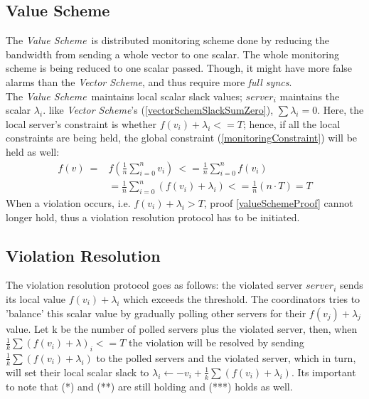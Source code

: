 \documentclass[10pt,a4paper]{article}
\newcommand{\vecScheme}{\textit{Vector Scheme}}
\newcommand{\valueScheme}{\textit{Value Scheme}}
\begin{document}
\begin{multicols*}{2}
\section{Value Scheme}
The \valueScheme \ is distributed monitoring scheme done by reducing the bandwidth from sending a whole vector to one scalar. The whole monitoring scheme is being reduced to one scalar passed. Though, it might have more false alarms than the \vecScheme , and thus require more \textit{full syncs}. \\
The \valueScheme \  maintains local scalar slack values; $server_i$ maintains the scalar $\lambda _i$. like \vecScheme 's (\ref{vectorSchemSlackSumZero}), $\sum{\lambda _i} = 0$. Here, the local server's constraint is whether $f(v_i) + \lambda _i <= T$; hence, if all the local constraints are being held, the global constraint (\ref{monitoringConstraint}) will be held as well:
\begin{equation}
\label{valueSchemeProof}
\begin{aligned}
 f(v)  \
	    ={} & f\left(\frac{1}{n} \sum\limits_{i=0}^{n}{v_i}\right)  \
       <=   \frac{1}{n} \sum\limits_{i=0}^{n}f(v_i) \\
     &  =   \frac{1}{n} \sum\limits_{i=0}^{n}{(f(v_i) + \lambda _i)}
       <=   \frac{1}{n}(n \cdot T)
        = T
\end{aligned}
\end{equation}
When a violation occurs, i.e. $f(v_i) + \lambda _i > T$, proof \ref{valueSchemeProof} cannot longer hold, thus a violation resolution protocol has to be initiated.
\subsection{Violation Resolution}
The violation resolution protocol goes as follows: the violated server $server_i$ sends its local value $f(v_i) + \lambda _i$ which exceeds the threshold. The coordinators tries to 'balance' this scalar value by gradually polling other servers for their $f(v_j) + \lambda _j$ value. Let k be the number of polled servers plus the violated server, then, when $\frac{1}{k}\sum{(f(v_i) + \lambda ) _i} <= T$ the violation will be resolved by sending $\frac{1}{k}\sum{(f(v_i) + \lambda _i)}$ to the polled servers and the violated server, which in turn, will set their local scalar slack to $\lambda _i \leftarrow -v_i + \frac{1}{k}\sum{(f(v_i) + \lambda _i)}$. Its important to note that (*) and (**) are still holding and (***) holds as well.


\end{multicols*}
\end{document}
